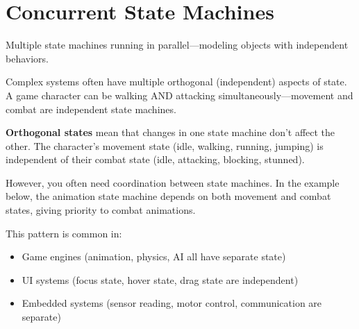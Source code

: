 \section{Concurrent State Machines}

Multiple state machines running in parallel---modeling objects with independent behaviors.

Complex systems often have multiple orthogonal (independent) aspects of state. A game character can be walking AND attacking simultaneously---movement and combat are independent state machines.

\textbf{Orthogonal states} mean that changes in one state machine don't affect the other. The character's movement state (idle, walking, running, jumping) is independent of their combat state (idle, attacking, blocking, stunned).

However, you often need coordination between state machines. In the example below, the animation state machine depends on both movement and combat states, giving priority to combat animations.

This pattern is common in:
\begin{itemize}
    \item Game engines (animation, physics, AI all have separate state)
    \item UI systems (focus state, hover state, drag state are independent)
    \item Embedded systems (sensor reading, motor control, communication are separate)
\end{itemize}

